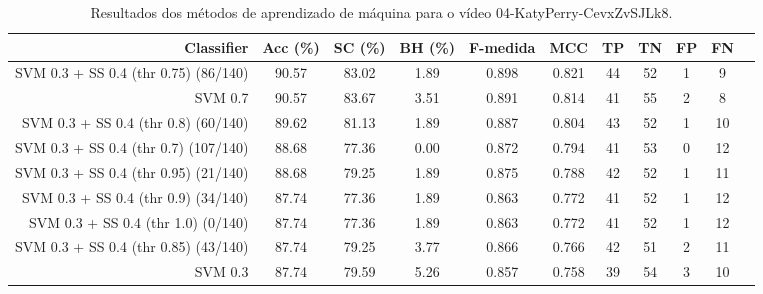 \begin{table}[!htb]
\centering
\caption{Resultados dos métodos de aprendizado de máquina para o vídeo 04-KatyPerry-CevxZvSJLk8.}
\label{tab:04-KatyPerry-CevxZvSJLk8}
\begin{tabular}{r|c|c|c|c|c|c|c|c|c|c}
\hline\hline
Classifier & Acc (\%) & SC (\%) & BH (\%) & F-medida & MCC & TP & TN & FP & FN \\ \hline
SVM 0.3 + SS 0.4 (thr 0.75) (86/140) & 90.57 & 83.02 & 1.89 & 0.898 & 0.821 & 44 & 52 & 1 & 9 \\ 
SVM 0.7 & 90.57 & 83.67 & 3.51 & 0.891 & 0.814 & 41 & 55 & 2 & 8 \\ 
SVM 0.3 + SS 0.4 (thr 0.8) (60/140) & 89.62 & 81.13 & 1.89 & 0.887 & 0.804 & 43 & 52 & 1 & 10 \\ 
SVM 0.3 + SS 0.4 (thr 0.7) (107/140) & 88.68 & 77.36 & 0.00 & 0.872 & 0.794 & 41 & 53 & 0 & 12 \\ 
SVM 0.3 + SS 0.4 (thr 0.95) (21/140) & 88.68 & 79.25 & 1.89 & 0.875 & 0.788 & 42 & 52 & 1 & 11 \\ 
SVM 0.3 + SS 0.4 (thr 0.9) (34/140) & 87.74 & 77.36 & 1.89 & 0.863 & 0.772 & 41 & 52 & 1 & 12 \\ 
SVM 0.3 + SS 0.4 (thr 1.0) (0/140) & 87.74 & 77.36 & 1.89 & 0.863 & 0.772 & 41 & 52 & 1 & 12 \\ 
SVM 0.3 + SS 0.4 (thr 0.85) (43/140) & 87.74 & 79.25 & 3.77 & 0.866 & 0.766 & 42 & 51 & 2 & 11 \\ 
SVM 0.3 & 87.74 & 79.59 & 5.26 & 0.857 & 0.758 & 39 & 54 & 3 & 10 \\ 
\hline\hline
\end{tabular}
\end{table}
